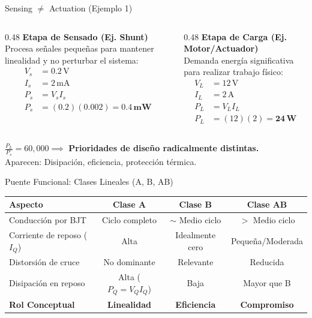 \documentclass[aspectratio=169, table]{beamer}
\begin{document}
\begin{frame}{Sensing $\neq$ Actuation (Ejemplo 1)}
    \begin{columns}
        \begin{column}{0.48\textwidth}
            \textbf{Etapa de Sensado (Ej. Shunt)} \\
            Procesa señales pequeñas para mantener linealidad y no perturbar el sistema:
            \begin{align*}
                V_s &= 0.2\,\text{V} \\
                I_s &= 2\,\text{mA} \\
                P_s &= V_s I_s \\
                P_s &= (0.2)(0.002) = \mathbf{0.4\,\text{mW}}
            \end{align*}
        \end{column}
        \begin{column}{0.48\textwidth}
            \textbf{Etapa de Carga (Ej. Motor/Actuador)} \\
            Demanda energía significativa para realizar trabajo físico:
            \begin{align*}
                V_L &= 12\,\text{V} \\
                I_L &= 2\,\text{A} \\
                P_L &= V_L I_L \\
                P_L &= (12)(2) = \mathbf{24\,\text{W}}
            \end{align*}
        \end{column}
    \end{columns}
    \vspace{0.5cm}
    \centering
    \Large $\frac{P_L}{P_s} = 60,000 \implies$ \textbf{Prioridades de diseño radicalmente distintas.} \\
    \normalsize Aparecen: Disipación, eficiencia, protección térmica.
\end{frame}

\begin{frame}{Puente Funcional: Clases Lineales (A, B, AB)}
    \begin{table}[]
        \centering
        \begin{tabular}{@{}lccc@{}}
        \toprule
        \textbf{Aspecto} & \textbf{Clase A} & \textbf{Clase B} & \textbf{Clase AB} \\ \midrule
        Conducción por BJT & Ciclo completo & $\sim$ Medio ciclo & $>$ Medio ciclo \\
        Corriente de reposo ($I_Q$) & Alta & Idealmente cero & Pequeña/Moderada \\
        Distorsión de cruce & No dominante & Relevante & Reducida \\
        Disipación en reposo & Alta ($P_Q = V_Q I_Q$) & Baja & Mayor que B \\
        \textbf{Rol Conceptual} & \textbf{Linealidad} & \textbf{Eficiencia} & \textbf{Compromiso} \\ \bottomrule
        \end{tabular}
    \end{table}
\end{frame}
\end{document}
